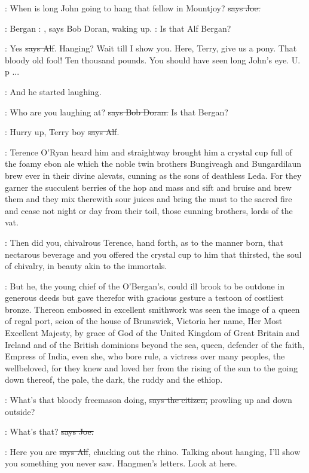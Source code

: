 \joe:
When is long John going to hang that fellow in Mountjoy?
 \sout{says Joe.}

\doran:
Bergan
\Nq:
, \sout{}says Bob Doran, waking up.
\doran:
Is that Alf Bergan?

\bergan:
Yes \sout{says Alf}. Hanging?
Wait till I show you. Here, Terry, give us a
pony. That bloody old fool! Ten thousand pounds. You should have seen long
John's eye. U. p ...

\Nq:
And he started laughing.

\doran:
Who are you laughing at? \sout{says Bob Doran.}
Is that Bergan?

\bergan:
Hurry up, Terry boy \sout{says Alf}.

:
Terence O'Ryan heard him and straightway brought him a crystal
cup full of the foamy ebon ale which the noble twin brothers Bungiveagh
and Bungardilaun brew ever in their divine alevats, cunning as the sons of
deathless Leda. For they garner the succulent berries of the hop and mass
and sift and bruise and brew them and they mix therewith sour juices and
bring the must to the sacred fire and cease not night or day from their
toil, those cunning brothers, lords of the vat.

:
Then did you, chivalrous Terence, hand forth, as to the manner born,
that nectarous beverage and you offered the crystal cup to him that
thirsted, the soul of chivalry, in beauty akin to the immortals.

:
But he, the young chief of the O'Bergan's, could ill brook to be outdone
in generous deeds but gave therefor with gracious gesture a testoon
of costliest bronze. Thereon embossed in excellent smithwork was seen the
image of a queen of regal port, scion of the house of Brunswick, Victoria
her name, Her Most Excellent Majesty, by grace of God of the United
Kingdom of Great Britain and Ireland and of the British dominions beyond
the sea, queen, defender of the faith, Empress of India, even she, who
bore rule, a victress over many peoples, the wellbeloved, for they knew
and loved her from the rising of the sun to the going down thereof, the
pale, the dark, the ruddy and the ethiop.

\citizen:
What's that bloody freemason doing,
\sout{says the citizen,}
prowling up and down outside?

\joe:
What's that? \sout{says Joe.}

\bergan:
Here you are \sout{says Alf}, chucking out the rhino.
Talking about hanging,
I'll show you something you never saw. Hangmen's letters. Look at here.

